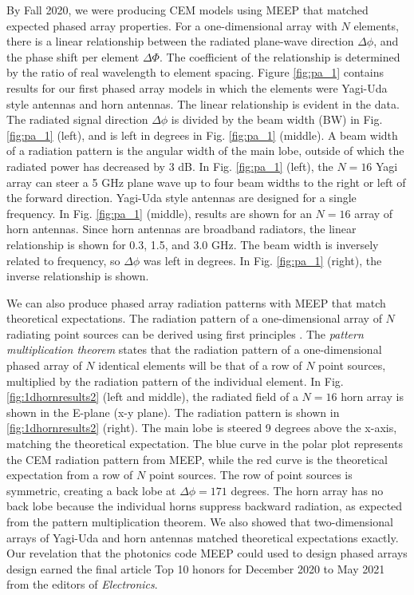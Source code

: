 \documentclass[../../main.tex]{subfiles}
\begin{document}
By Fall 2020, we were producing CEM models using MEEP that matched expected phased array properties.  For a one-dimensional array with $N$ elements, there is a linear relationship between the radiated plane-wave direction $\Delta \phi$, and the phase shift per element $\Delta \Phi$.  The coefficient of the relationship is determined by the ratio of real wavelength to element spacing.  Figure \ref{fig:pa_1} contains results for our first phased array models in which the elements were Yagi-Uda style antennas and horn antennas.  The linear relationship is evident in the data.  The radiated signal direction $\Delta \phi$ is divided by the beam width (BW) in Fig. \ref{fig:pa_1} (left), and is left in degrees in Fig. \ref{fig:pa_1} (middle).  A beam width of a radiation pattern is the angular width of the main lobe, outside of which the radiated power has decreased by 3 dB.  In Fig. \ref{fig:pa_1} (left), the $N=16$ Yagi array can steer a 5 GHz plane wave up to four beam widths to the right or left of the forward direction.  Yagi-Uda style antennas are designed for a single frequency.  In Fig. \ref{fig:pa_1} (middle), results are shown for an $N=16$ array of horn antennas.  Since horn antennas are broadband radiators, the linear relationship is shown for 0.3, 1.5, and 3.0 GHz.  The beam width is inversely related to frequency, so $\Delta \phi$ was left in degrees.  In Fig. \ref{fig:pa_1} (right), the inverse relationship is shown. \\ \vspace{2.5mm}

We can also produce phased array radiation patterns with MEEP that match theoretical expectations.  The radiation pattern of a one-dimensional array of $N$ radiating point sources can be derived using first principles \cite{electronics10040415}.  The \textit{pattern multiplication theorem} states that the radiation pattern of a one-dimensional phased array of $N$ identical elements will be that of a row of $N$ point sources, multiplied by the radiation pattern of the individual element.  In Fig. \ref{fig:1dhornresults2} (left and middle), the radiated field of a $N=16$ horn array is shown in the E-plane (x-y plane).  The radiation pattern is shown in \ref{fig:1dhornresults2} (right).  The main lobe is steered 9 degrees above the x-axis, matching the theoretical expectation.  The blue curve in the polar plot represents the CEM radiation pattern from MEEP, while the red curve is the theoretical expectation from a row of $N$ point sources.  The row of point sources is symmetric, creating a back lobe at $\Delta \phi = 171$ degrees.  The horn array has no back lobe because the individual horns suppress backward radiation, as expected from the pattern multiplication theorem.  We also showed that two-dimensional arrays of Yagi-Uda and horn antennas matched theoretical expectations exactly.  Our revelation that the photonics code MEEP could used to design phased arrays design earned the final article Top 10 honors for December 2020 to May 2021 from the editors of \textit{Electronics}. \\ \vspace{2.5mm}
\end{document}

